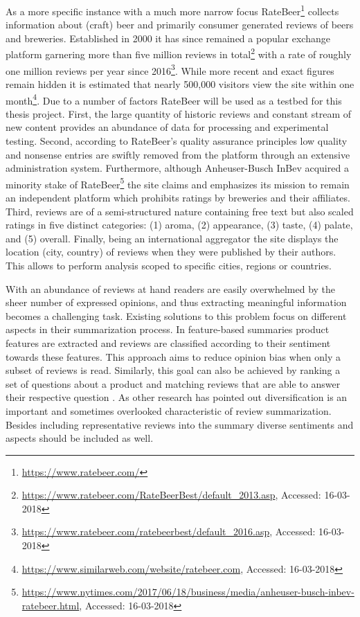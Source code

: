 As a more specific instance with a much more narrow focus RateBeer\footnote{\url{https://www.ratebeer.com/}} collects information about (craft) beer and primarily consumer generated reviews of beers and breweries.
Established in 2000 it has since remained a popular exchange platform garnering more than five million reviews in total\footnote{\url{https://www.ratebeer.com/RateBeerBest/default_2013.asp}, Accessed: 16-03-2018} with a rate of roughly one million reviews per year since 2016\footnote{\url{https://www.ratebeer.com/ratebeerbest/default_2016.asp}, Accessed: 16-03-2018}.
While more recent and exact figures remain hidden it is estimated that nearly 500,000 visitors view the site within one month\footnote{\url{https://www.similarweb.com/website/ratebeer.com}, Accessed: 16-03-2018}.
Due to a number of factors RateBeer will be used as a testbed for this thesis project.
First, the large quantity of historic reviews and constant stream of new content provides an abundance of data for processing and experimental testing.
Second, according to RateBeer's quality assurance principles low quality and nonsense entries are swiftly removed from the platform through an extensive administration system.
Furthermore, although Anheuser-Busch InBev acquired a minority stake of RateBeer\footnote{\url{https://www.nytimes.com/2017/06/18/business/media/anheuser-busch-inbev-ratebeer.html}, Accessed: 16-03-2018} the site claims and emphasizes its mission to remain an independent platform which prohibits ratings by breweries and their affiliates.
Third, reviews are of a semi-structured nature containing free text but also scaled ratings in five distinct categories: (1) aroma, (2) appearance, (3) taste, (4) palate, and (5) overall.
Finally, being an international aggregator the site displays the location (city, country) of reviews when they were published by their authors.
This allows to perform analysis scoped to specific cities, regions or countries.

With an abundance of reviews at hand readers are easily overwhelmed by the sheer number of expressed opinions, and thus extracting meaningful information becomes a challenging task.
Existing solutions to this problem focus on different aspects in their summarization process.
In feature-based summaries \cite{Hu2004} product features are extracted and reviews are classified according to their sentiment towards these features.
This approach aims to reduce opinion bias when only a subset of reviews is read.
Similarly, this goal can also be achieved by ranking a set of questions about a product and matching reviews that are able to answer their respective question \cite{Liu2017}.
As other research has pointed out \cite{Liu2017, Al-Dhelaan2017} diversification is an important and sometimes overlooked characteristic of review summarization.
Besides including representative reviews into the summary diverse sentiments and aspects should be included as well.

